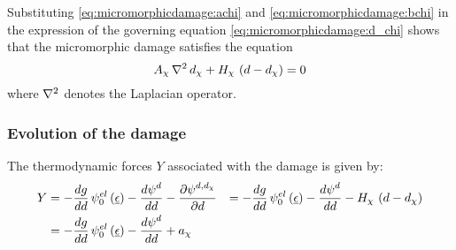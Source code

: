 Substituting \eqref{eq:micromorphicdamage:achi} and \eqref{eq:micromorphicdamage:bchi} in the expression of the governing equation \eqref{eq:micromorphicdamage:d_chi} shows that the micromorphic damage satisfies the equation
%
%
%
\begin{equation}
  \label{eq:micromorphicdamage:d_chi2}
  A_{\chi}\,\nabla{}^2\,d_{\chi}+ H_{\chi}\,\left(d-d_{\chi}\right)= 0
\end{equation}
%
%
%
where \(\nabla{}^2\) denotes the Laplacian operator.

\subsubsection{Evolution of the damage}

The thermodynamic forces \(Y\) associated with the damage is given by:
%
%
%
\begin{equation}
  \label{eq:micromorphicdamage:Y}
  \begin{aligned}
    Y &= -\displaystyle \frac{\displaystyle dg}{\displaystyle dd}\,{\psi}^{el}_{0}\left(\underline{\epsilon}\right)-\displaystyle \frac{\displaystyle d{\psi}^{d}}{\displaystyle dd}-\displaystyle \frac{\displaystyle \partial {\psi}^{d, d_{\chi}}}{\displaystyle \partial d}
    &=-\displaystyle \frac{\displaystyle dg}{\displaystyle dd}\,{\psi}^{el}_{0}\left(\underline{\epsilon}\right)-\displaystyle \frac{\displaystyle d{\psi}^{d}}{\displaystyle dd}-H_{\chi}\,\left(d-d_{\chi}\right)
    \\
    &=-\displaystyle \frac{\displaystyle dg}{\displaystyle dd}\,{\psi}^{el}_{0}\left(\underline{\epsilon}\right)-\displaystyle \frac{\displaystyle d{\psi}^{d}}{\displaystyle dd}+a_{\chi}
    \\
  \end{aligned}
\end{equation}

